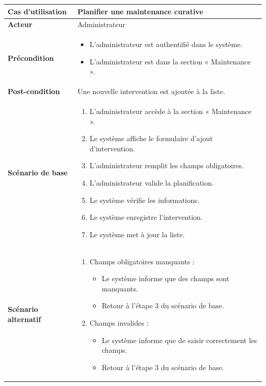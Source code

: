 \documentclass[a4paper,11pt]{report}
\begin{document}
\begin{tabularx}{\textwidth}{|>{\bfseries}l|X|}
\hline
Cas d’utilisation    & Planifier une maintenance curative \\
\hline
Acteur               & Administrateur \\
\hline
Précondition         &
\begin{itemize}[left=0pt]
  \item L’administrateur est authentifié dans le système.
  \item  L’administrateur est dans la section « Maintenance ».
\end{itemize} \\
\hline
Post-condition       & Une nouvelle intervention est ajoutée à la liste. \\
\hline
Scénario de base     &
\begin{enumerate}[left=0pt]
  \item L’administrateur accède à la section « Maintenance ».
  \item Le système affiche le formulaire d’ajout d’intervention.
  \item L’administrateur remplit les champs obligatoires.
  \item L’administrateur valide la planification.
  \item Le système vérifie les informations.
  \item Le système enregistre l’intervention.
  \item Le système met à jour la liste.
\end{enumerate} \\
\hline
Scénario alternatif   &
\begin{enumerate}[label=\arabic*.a,wide=0pt]
  \item[5.a] Champs obligatoires manquants :
    \begin{itemize}[left=1em]
      \item Le système informe que des champs sont manquants.
      \item Retour à l’étape 3 du scénario de base.
    \end{itemize}
    \item[5.b] Champs invalides :
    \begin{itemize}[left=1em]
      \item Le système informe que de saisir correctement les champs.
      \item Retour à l’étape 3 du scénario de base.
    \end{itemize}
\end{enumerate} \\
\hline
\end{tabularx}
\end{document}
